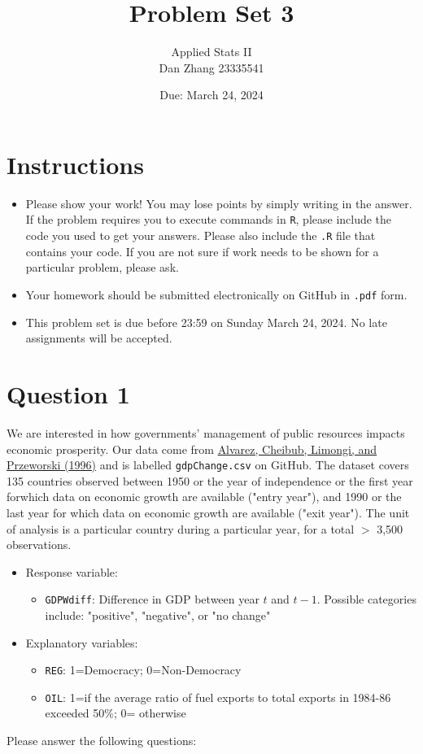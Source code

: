 \documentclass[12pt,letterpaper]{article}
\title{Problem Set 3}
\date{Due: March 24, 2024}
\author{Applied Stats II \\  Dan Zhang 23335541}
\begin{document}
	\maketitle
	\section*{Instructions}
	\begin{itemize}
	\item Please show your work! You may lose points by simply writing in the answer. If the problem requires you to execute commands in \texttt{R}, please include the code you used to get your answers. Please also include the \texttt{.R} file that contains your code. If you are not sure if work needs to be shown for a particular problem, please ask.
\item Your homework should be submitted electronically on GitHub in \texttt{.pdf} form.
\item This problem set is due before 23:59 on Sunday March 24, 2024. No late assignments will be accepted.
	\end{itemize}

	\vspace{.25cm}
\section*{Question 1}
\vspace{.25cm}
\noindent We are interested in how governments' management of public resources impacts economic prosperity. Our data come from \href{https://www.researchgate.net/profile/Adam_Przeworski/publication/240357392_Classifying_Political_Regimes/links/0deec532194849aefa000000/Classifying-Political-Regimes.pdf}{Alvarez, Cheibub, Limongi, and Przeworski (1996)} and is labelled \texttt{gdpChange.csv} on GitHub. The dataset covers 135 countries observed between 1950 or the year of independence or the first year forwhich data on economic growth are available ("entry year"), and 1990 or the last year for which data on economic growth are available ("exit year"). The unit of analysis is a particular country during a particular year, for a total $>$ 3,500 observations. 

\begin{itemize}
	\item
	Response variable: 
	\begin{itemize}
		\item \texttt{GDPWdiff}: Difference in GDP between year $t$ and $t-1$. Possible categories include: "positive", "negative", or "no change"
	\end{itemize}
	\item
	Explanatory variables: 
	\begin{itemize}
		\item
		\texttt{REG}: 1=Democracy; 0=Non-Democracy
		\item
		\texttt{OIL}: 1=if the average ratio of fuel exports to total exports in 1984-86 exceeded 50\%; 0= otherwise
	\end{itemize}
	
\end{itemize}
\newpage
\noindent Please answer the following questions:
\end{document}
